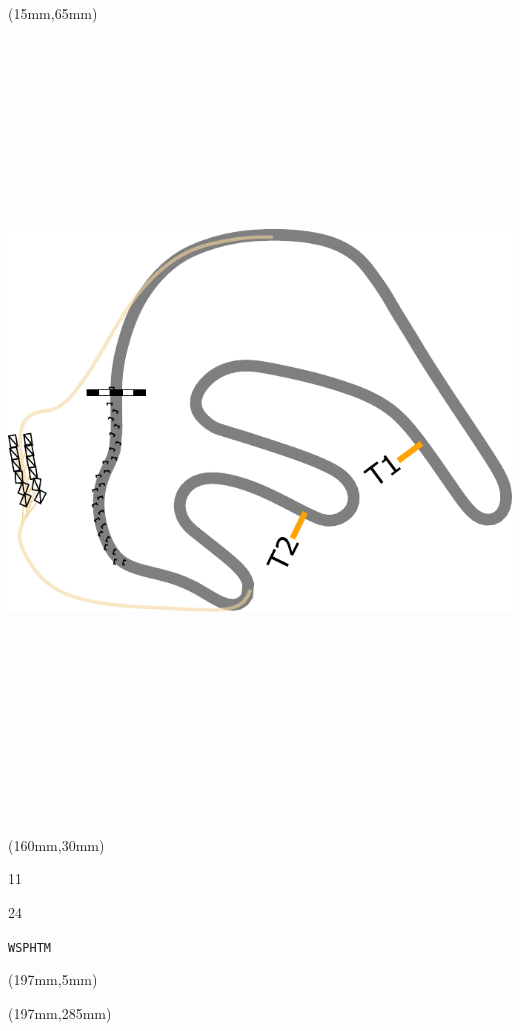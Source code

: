 \begin{textblock*}{185mm}(15mm,65mm)%
\centering
\mbox{\includegraphics[width=185mm,height=210mm,keepaspectratio]{PT/WSPHTM.pdf}}
\end{textblock*}
\begin{textblock*}{40mm}(160mm,30mm)%
\Large
\par{} 
\par11 
\par24 
\par\hfill\tiny\tt WSPHTM\\
\end{textblock*}
\begin{textblock*}{20mm}(197mm,5mm)%
\fbox{\thepage}
\label{WSPHTM}
\end{textblock*}
\begin{textblock*}{20mm}(197mm,285mm)%
\fbox{\thepage}
\end{textblock*}

